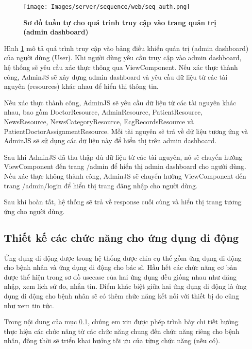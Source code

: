 \begin{figure}[H]
  \centering
  \texttt{[image: Images/server/sequence/web/seq\_auth.png]}
  \caption[Sơ đồ tuần tự cho quá trình truy cập vào trang quản trị (admin dashboard) ]{\bfseries \fontsize{12pt}{0pt}
  \selectfont Sơ đồ tuần tự cho quá trình truy cập vào trang quản trị (admin dashboard) }
  \label{seq_auth} %
\end{figure}
Hình \ref{seq_auth} mô tả quá trình truy cập vào bảng điều khiển quản trị (admin dashboard) của người dùng (User). Khi người dùng yêu cầu truy cập vào admin dashboard, hệ thống sẽ yêu cầu xác thực thông qua ViewComponent. Nếu xác thực thành công, AdminJS sẽ xây dựng admin dashboard và yêu cầu dữ liệu từ các tài nguyên (resources) khác nhau để hiển thị thông tin.



Nếu xác thực thành công, AdminJS sẽ yêu cầu dữ liệu từ các tài nguyên khác nhau, bao gồm DoctorResource, AdminResource, PatientResource, NewsResource, NewsCategoryResource, EcgRecordsResource và PatientDoctorAssignmentResource. Mỗi tài nguyên sẽ trả về dữ liệu tương ứng và AdminJS sẽ sử dụng các dữ liệu này để hiển thị trên admin dashboard.



Sau khi AdminJS đã thu thập đủ dữ liệu từ các tài nguyên, nó sẽ chuyển hướng ViewComponent đến trang /admin để hiển thị admin dashboard cho người dùng. Nếu xác thực không thành công, AdminJS sẽ chuyển hướng ViewComponent đến trang /admin/login để hiển thị trang đăng nhập cho người dùng.



Sau khi hoàn tất, hệ thống sẽ trả về response cuối cùng và hiển thị trang tương ứng cho người dùng.


\subsection{Thiết kế các chức năng cho ứng dụng di động}
\label{design_function_mobile}

Ứng dụng di động được trong hệ thống được chia cụ thể gồm ứng dụng di động cho bệnh nhân và ứng dụng di động cho bác sĩ. 
Hầu hết các chức năng cơ bản được thể hiện trong sơ đồ usecase của hai ứng dụng đều giống nhau như đăng nhập, xem lịch sử đo, nhắn tin.
Điểm khác biệt giữa hai ứng dụng di động là ứng dụng di động cho bệnh nhân sẽ có thêm chức năng kết nối với thiết bị đo cũng như xem tin tức.

Trong nội dung của mục \ref{design_function_mobile}, chúng em xin được phép trình bày chi tiết hướng thực hiện các chức năng
từ các chức năng chung đến chức năng riêng cho bệnh nhân, đồng thời sẽ triển khai hướng tối ưu của từng chức năng (nếu có).

